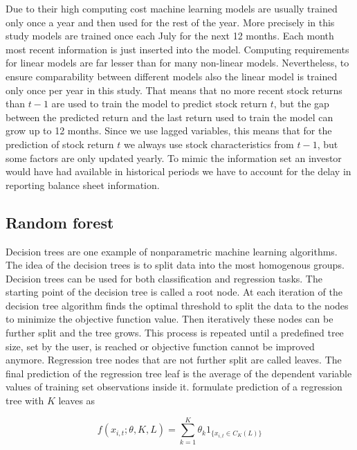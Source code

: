\documentclass[12pt]{article}
\begin{document}
Due to their high computing cost machine learning models are usually trained only once a year and then used for the rest of the year. More precisely in this study models are trained once each July for the next 12 months. Each month most recent information is just inserted into the model. Computing requirements for linear models are far lesser than for many non-linear models. Nevertheless, to ensure comparability between different models also the linear model is trained only once per year in this study. That means that no more recent stock returns than $t-1$ are used to train the model to predict stock return $t$, but the gap between the predicted return and the last return used to train the model can grow up to 12 months. Since we use lagged variables, this means that for the prediction of stock return $t$ we always use stock characteristics from $t-1$, but some factors are only updated yearly. To mimic the information set an investor would have had available in historical periods we have to account for the delay in reporting balance sheet information. \par

\subsection{Random forest}

Decision trees are one example of nonparametric machine learning algorithms. The idea of the decision trees is to split data into the most homogenous groups. Decision trees can be used for both classification and regression tasks. The starting point of the decision tree is called a root node. At each iteration of the decision tree algorithm finds the optimal threshold to split the data to the nodes to minimize the objective function value. Then iteratively these nodes can be further split and the tree grows. This process is repeated until a predefined tree size, set by the user, is reached or objective function cannot be improved anymore. Regression tree nodes that are not further split are called leaves. The final prediction of the regression tree leaf is the average of the dependent variable values of training set observations inside it. \citet{guetal} formulate prediction of a regression tree with $K$ leaves as \par

\begin{equation}
f(x_{i, t}; \theta, K, L) = \sum_{k=1}^K \theta_k 1 _{\{x_{i, t} \in C_K(L)\}}
\end{equation}
\end{document}
